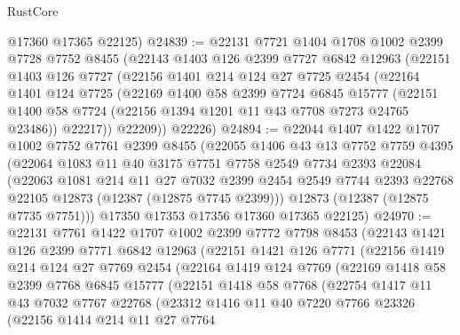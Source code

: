 \begin{lexlean}{RustCore}
\begin{coremodule}
      @17360
      @17365
      @22125)
@24839 := @22131
    @7721
    @1404
    @1708
    @1002
    @2399
    @7728
    @7752
    @8455
    (@22143
      @1403
      @126
      @2399
      @7727
      @6842
      @12963
      (@22151
        @1403
        @126
        @7727
        (@22156
          @1401
          @214
          @124
          @27
          @7725
          @2454
          (@22164
            @1401
            @124
            @7725
            (@22169
              @1400
              @58
              @2399
              @7724
              @6845
              @15777
              (@22151 @1400 @58 @7724 (@22156 @1394 @1201 @11 @43 @7708 @7273 @24765 @23486))
              @22217))
          @22209))
      @22226)
@24894 := @22044
    @1407
    @1422
    @1707
    @1002
    @7752
    @7761
    @2399
    @8455
    (@22055
      @1406
      @43
      @13
      @7752
      @7759
      @4395
      (@22064
        @1083
        @11
        @40
        @3175
        @7751
        @7758
        @2549
        @7734
        @2393
        @22084
        (@22063
          @1081
          @214
          @11
          @27
          @7032
          @2399
          @2454
          @2549
          @7744
          @2393
          @22768
          @22105
          @12873
          (@12387 (@12875 @7745 @2399)))
        @12873
        (@12387 (@12875 @7735 @7751)))
      @17350
      @17353
      @17356
      @17360
      @17365
      @22125)
@24970 := @22131
    @7761
    @1422
    @1707
    @1002
    @2399
    @7772
    @7798
    @8453
    (@22143
      @1421
      @126
      @2399
      @7771
      @6842
      @12963
      (@22151
        @1421
        @126
        @7771
        (@22156
          @1419
          @214
          @124
          @27
          @7769
          @2454
          (@22164
            @1419
            @124
            @7769
            (@22169
              @1418
              @58
              @2399
              @7768
              @6845
              @15777
              (@22151
                @1418
                @58
                @7768
                (@22754
                  @1417
                  @11
                  @43
                  @7032
                  @7767
                  @22768
                  (@23312
                    @1416
                    @11
                    @40
                    @7220
                    @7766
                    @23326
                    (@22156
                      @1414
                      @214
                      @11
                      @27
                      @7764

\end{coremodule}
\end{lexlean}
